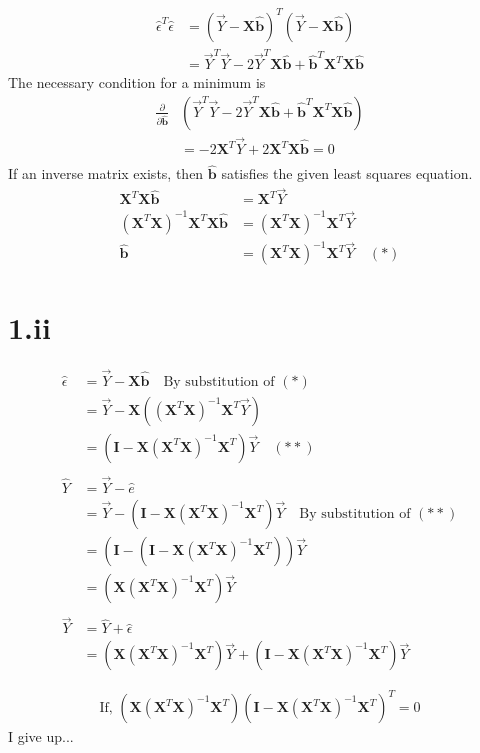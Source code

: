 \documentclass[letterpaper,12pt,titlepage,oneside,final]{book}
\newcommand{\matr}[1]{\mathbf{#1}} %
\begin{document}
\begin{align*}
\hat{\epsilon}^T \hat{\epsilon} 
&= 
(\vec{Y}-\matr{X}\matr{\hat{b}})^T (\vec{Y}-\matr{X}\matr{\hat{b}})\\
&=\vec{Y}^T \vec{Y} - 2\vec{Y}^T \matr{X}\hat{\matr{b}} + \hat{\matr{b}}^T \matr{X}^T \matr{X} \hat{\matr{b}}
\end{align*}
The necessary condition for a minimum is
\begin{align*}
 \frac{\partial}{\partial\hat{\matr{b}}}&\left(\vec{Y}^T \vec{Y} - 2\vec{Y}^T \matr{X}\hat{\matr{b}} + \hat{\matr{b}}^T \matr{X}^T \matr{X} \hat{\matr{b}}\right)\\
&= -2\matr{X}^T\vec{Y} + 2\matr{X}^T\matr{X}\hat{\matr{b}} =0\\
\end{align*}
If an inverse matrix exists, then $\hat{\matr{b}}$ satisfies the given least squares equation. 
\begin{align*}
\matr{X}^T\matr{X}\hat{\matr{b}} &= \matr{X}^T \vec{Y}\\
(\matr{X}^T\matr{X})^{-1}\matr{X}^T\matr{X}\hat{\matr{b}} &= (\matr{X}^T\matr{X})^{-1}\matr{X}^T \vec{Y}\\
\hat{\matr{b}}&=(\matr{X}^T\matr{X})^{-1}\matr{X}^T \vec{Y} \quad (*)
\end{align*}

\cleardoublepage

\section*{1.ii}
\begin{align*}
\hat{\epsilon} &= \vec{Y} - \matr{X}\matr{\hat{b}}\quad \text{By substitution of } (*)\\
&=\vec{Y} - \matr{X}\left( (\matr{X}^T\matr{X})^{-1}\matr{X}^T \vec{Y} \right)\\
&= \left(\matr{I} - \matr{X} (\matr{X}^T\matr{X})^{-1}\matr{X}^T  \right)\vec{Y}\quad (**)\\
\\
\hat{Y} &= \vec{Y} - \hat{e}\\
&=\vec{Y} - \left(\matr{I} - \matr{X} (\matr{X}^T\matr{X})^{-1}\matr{X}^T  \right)\vec{Y} \quad \text{By substitution of } (**)\\
& = \left( \matr{I} - \left(\matr{I} - \matr{X} (\matr{X}^T\matr{X})^{-1}\matr{X}^T  \right) \right) \vec{Y}\\
& =\left( \matr{X} (\matr{X}^T\matr{X})^{-1}\matr{X}^T \right)\vec{Y}\\
\\
\vec{Y} &= \hat{Y} + \hat{\epsilon}\\
&= \left( \matr{X} (\matr{X}^T\matr{X})^{-1}\matr{X}^T \right)\vec{Y} + \left(\matr{I} - \matr{X} (\matr{X}^T\matr{X})^{-1}\matr{X}^T  \right)\vec{Y}\\
\\
\end{align*}
\begin{align*}
\text{If, }\left( \matr{X} (\matr{X}^T\matr{X})^{-1}\matr{X}^T \right)\left(\matr{I} - \matr{X} (\matr{X}^T\matr{X})^{-1}\matr{X}^T  \right)^T = 0
\end{align*}
I give up...
\cleardoublepage
\end{document}
